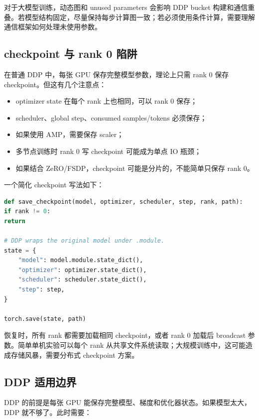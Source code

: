 对于大模型训练，动态图和 unused parameters 会影响 DDP bucket 构建和通信重叠。若模型结构固定，尽量保持每步计算图一致；若必须使用条件计算，需要理解通信框架如何处理未使用参数。

\subsection{checkpoint 与 rank 0 陷阱}
\label{subsec:checkpoint-rank0-pitfall}

在普通 DDP 中，每张 GPU 保存完整模型参数，理论上只需 rank 0 保存 checkpoint。但这有几个注意点：

\begin{itemize}
\item optimizer state 在每个 rank 上也相同，可以 rank 0 保存；
\item scheduler、global step、consumed samples/tokens 必须保存；
\item 如果使用 AMP，需要保存 scaler；
\item 多节点训练时 rank 0 写 checkpoint 可能成为单点 IO 瓶颈；
\item 如果结合 ZeRO/FSDP，checkpoint 可能是分片的，不能简单只保存 rank 0。
\end{itemize}

一个简化 checkpoint 写法如下：

\begin{lstlisting}[language=Python,caption={DDP 中仅 rank 0 保存 checkpoint 的简化示意},label={lst:ddp-rank0-checkpoint}]
def save_checkpoint(model, optimizer, scheduler, step, rank, path):
if rank != 0:
return

# DDP wraps the original model under .module.
state = {
    "model": model.module.state_dict(),
    "optimizer": optimizer.state_dict(),
    "scheduler": scheduler.state_dict(),
    "step": step,
}

torch.save(state, path)

\end{lstlisting}

恢复时，所有 rank 都需要加载相同 checkpoint，或者 rank 0 加载后 broadcast 参数。简单单机实验可以每个 rank 从共享文件系统读取；大规模训练中，这可能造成存储风暴，需要分布式 checkpoint 方案。

\subsection{DDP 适用边界}
\label{subsec:ddp-applicability-boundary}

DDP 的前提是每张 GPU 能保存完整模型、梯度和优化器状态。如果模型太大，DDP 就不够了。此时需要：

